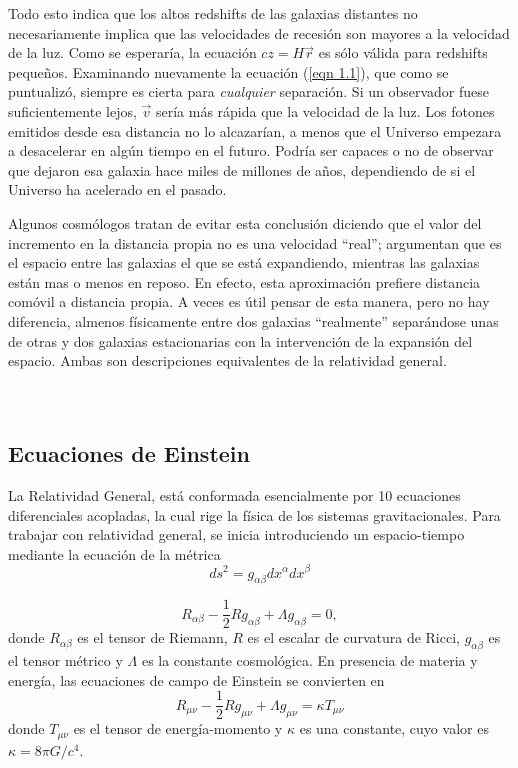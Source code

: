 \documentclass[a4paper,openright,12pt]{book}
\begin{document}
Todo esto indica que los altos redshifts de las galaxias distantes no necesariamente implica que las velocidades de recesión son mayores a la velocidad de la luz. Como se esperaría, la ecuación $cz = H\vec{r}$ es sólo válida para redshifts pequeños. Examinando nuevamente la ecuación (\ref{eqn 1.1}), que como se puntualizó, siempre es cierta para \textit{cualquier} separación. Si un observador fuese suficientemente lejos, $\vec{v}$ sería más rápida que la velocidad de la luz. Los fotones emitidos desde esa distancia no lo alcazarían, a menos que el Universo empezara a desacelerar en algún tiempo en el futuro. Podría ser capaces o no de observar que dejaron esa galaxia hace miles de millones de años, dependiendo de si el Universo ha acelerado en el pasado.

Algunos cosmólogos tratan de evitar esta conclusión diciendo que el valor del incremento en la distancia propia no es una velocidad ``real''; argumentan que es el espacio entre las galaxias el que se está expandiendo, mientras las galaxias están mas o menos en reposo. En efecto, esta aproximación prefiere distancia comóvil a distancia propia. A veces es útil pensar de esta manera, pero no hay diferencia, almenos físicamente entre dos galaxias ``realmente'' separándose unas de otras y dos galaxias estacionarias con la intervención de la expansión del espacio. Ambas son descripciones equivalentes de la relatividad general.\\\\\\


\subsection*{Ecuaciones de Einstein}

La Relatividad General, está conformada esencialmente por 10 ecuaciones diferenciales acopladas, la cual rige la física de los sistemas gravitacionales. Para trabajar con relatividad general, se inicia introduciendo un espacio-tiempo mediante la ecuación de la métrica
\begin{equation}
ds^{2}=g_{\alpha \beta}dx^{\alpha}dx^{\beta}\label{eqn 1.11}
\end{equation}

\begin{equation}
R_{\alpha \beta} - \frac{1}{2} R g_{\alpha \beta} + \Lambda g_{\alpha \beta} = 0,\label{eqn 1.12}
\end{equation}
donde $R_{\alpha \beta}$ es el tensor de Riemann, $R$ es el escalar de curvatura de Ricci, $g_{\alpha \beta}$ es el tensor métrico y $\Lambda$ es la constante cosmológica. En presencia de materia y energía, las ecuaciones de campo de Einstein se convierten en \cite{1.4}
\begin{equation}
R_{\mu \nu} - \frac{1}{2} R g_{\mu \nu} + \Lambda g_{\mu \nu} = \kappa T_{\mu \nu}\label{eqn 1.13}
\end{equation}
donde $T_{\mu \nu}$ es el tensor de energía-momento y $\kappa$ es una constante, cuyo valor es $\kappa = 8 \pi G / c^{4}$.
\end{document}
